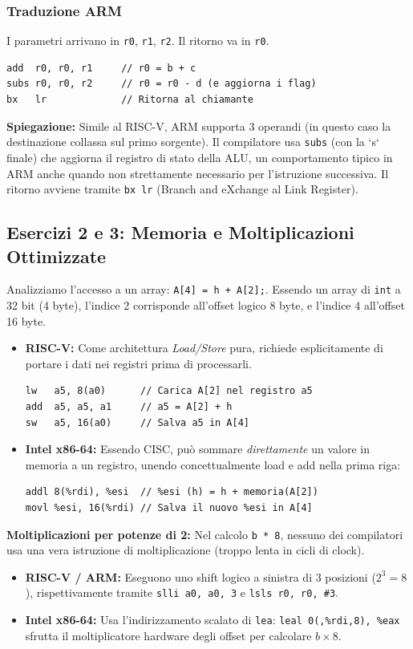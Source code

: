 \documentclass[12pt, a4paper]{article}
\begin{document}
\subsubsection{Traduzione ARM}
I parametri arrivano in \texttt{r0}, \texttt{r1}, \texttt{r2}. Il ritorno va in \texttt{r0}.
\begin{verbatim}
add  r0, r0, r1     // r0 = b + c
subs r0, r0, r2     // r0 = r0 - d (e aggiorna i flag)
bx   lr             // Ritorna al chiamante
\end{verbatim}
\textbf{Spiegazione:} Simile al RISC-V, ARM supporta 3 operandi (in questo caso la destinazione collassa sul primo sorgente). Il compilatore usa \texttt{subs} (con la `s` finale) che aggiorna il registro di stato della ALU, un comportamento tipico in ARM anche quando non strettamente necessario per l'istruzione successiva. Il ritorno avviene tramite \texttt{bx lr} (Branch and eXchange al Link Register).

\subsection{Esercizi 2 e 3: Memoria e Moltiplicazioni Ottimizzate}
Analizziamo l'accesso a un array: \texttt{A[4] = h + A[2];}. 
Essendo un array di \texttt{int} a 32 bit (4 byte), l'indice 2 corrisponde all'offset logico 8 byte, e l'indice 4 all'offset 16 byte.

\newpage

\begin{itemize}
    \item \textbf{RISC-V:} Come architettura \textit{Load/Store} pura, richiede esplicitamente di portare i dati nei registri prima di processarli.
\begin{verbatim}
lw   a5, 8(a0)      // Carica A[2] nel registro a5
add  a5, a5, a1     // a5 = A[2] + h
sw   a5, 16(a0)     // Salva a5 in A[4]
\end{verbatim}
    \item \textbf{Intel x86-64:} Essendo CISC, può sommare \textit{direttamente} un valore in memoria a un registro, unendo concettualmente load e add nella prima riga:
\begin{verbatim}
addl 8(%rdi), %esi  // %esi (h) = h + memoria(A[2])
movl %esi, 16(%rdi) // Salva il nuovo %esi in A[4]
\end{verbatim}
\end{itemize}

\noindent \textbf{Moltiplicazioni per potenze di 2:} Nel calcolo \texttt{b * 8}, nessuno dei compilatori usa una vera istruzione di moltiplicazione (troppo lenta in cicli di clock).
\begin{itemize}
    \item \textbf{RISC-V / ARM:} Eseguono uno shift logico a sinistra di 3 posizioni ($2^3 = 8$), rispettivamente tramite \texttt{slli a0, a0, 3} e \texttt{lsls r0, r0, \#3}.
    \item \textbf{Intel x86-64:} Usa l'indirizzamento scalato di \texttt{lea}: \texttt{leal 0(,\%rdi,8), \%eax} sfrutta il moltiplicatore hardware degli offset per calcolare $b \times 8$.
\end{itemize}
\end{document}
